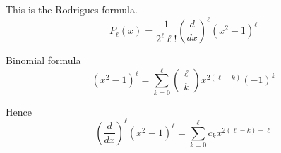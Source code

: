 


\bigskip
This is the Rodrigues formula.
\begin{equation*}
P_\ell(x)=\frac{1}{2^\ell\ell!}\left(\frac{d}{dx}\right)^\ell
\left(x^2-1\right)^\ell
\end{equation*}

Binomial formula
\begin{equation*}
\left(x^2-1\right)^\ell=\sum_{k=0}^\ell\binom{\ell}{k}x^{2(\ell-k)}(-1)^k
\end{equation*}

Hence
\begin{equation*}
\left(\frac{d}{dx}\right)^\ell\left(x^2-1\right)^\ell
=\sum_{k=0}^\ell c_kx^{2(\ell-k)-\ell}
\end{equation*}


